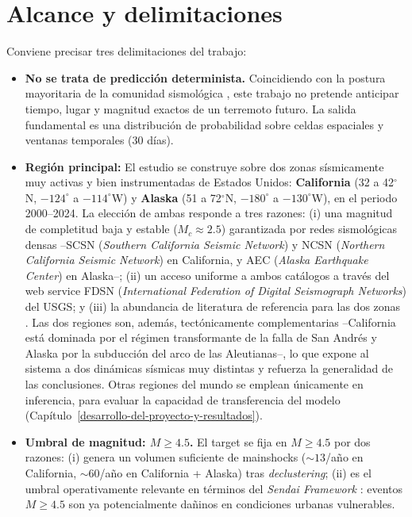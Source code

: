 \section{Alcance y delimitaciones}
\label{alcance}

Conviene precisar tres delimitaciones del trabajo:

\begin{itemize}
  \item \textbf{No se trata de predicción determinista.} Coincidiendo con la postura mayoritaria de la comunidad sismológica \citep{geller1997unpredictable, jordan2011oef}, este trabajo no pretende anticipar tiempo, lugar y magnitud exactos de un terremoto futuro. La salida fundamental es una distribución de probabilidad sobre celdas espaciales y ventanas temporales (\(30\) días).

  \item \textbf{Región principal:} El estudio se construye sobre dos zonas sísmicamente muy activas y bien instrumentadas de Estados Unidos: \textbf{California} (32 a 42$^{\circ}$N, $-124^{\circ}$ a $-114^{\circ}$W) y \textbf{Alaska} (51 a 72$^{\circ}$N, $-180^{\circ}$ a $-130^{\circ}$W), en el periodo 2000--2024. La elección de ambas responde a tres razones: (i) una magnitud de completitud baja y estable ($M_c \approx 2.5$) garantizada por redes sismológicas densas --SCSN (\textit{Southern California Seismic Network}) y NCSN (\textit{Northern California Seismic Network}) en California, y AEC (\textit{Alaska Earthquake Center}) en Alaska--; (ii) un acceso uniforme a ambos catálogos a través del web service FDSN (\textit{International Federation of Digital Seismograph Networks}) del USGS; y (iii) la abundancia de literatura de referencia para las dos zonas \citep{hauksson2012relocated, waldhauser2008doubledifference, field2014ucerf3}. Las dos regiones son, además, tectónicamente complementarias --California está dominada por el régimen transformante de la falla de San Andrés y Alaska por la subducción del arco de las Aleutianas--, lo que expone al sistema a dos dinámicas sísmicas muy distintas y refuerza la generalidad de las conclusiones. Otras regiones del mundo se emplean únicamente en inferencia, para evaluar la capacidad de transferencia del modelo (Capítulo~\ref{desarrollo-del-proyecto-y-resultados}).

  \item \textbf{Umbral de magnitud: $M \geq 4.5$.} El target se fija en $M \geq 4.5$ por dos razones: (i) genera un volumen suficiente de mainshocks ($\sim 13$/año en California, $\sim 60$/año en California + Alaska) tras \emph{declustering}; (ii) es el umbral operativamente relevante en términos del \textit{Sendai Framework} \citep{un2015sendai}: eventos $M \geq 4.5$ son ya potencialmente dañinos en condiciones urbanas vulnerables.
\end{itemize}


